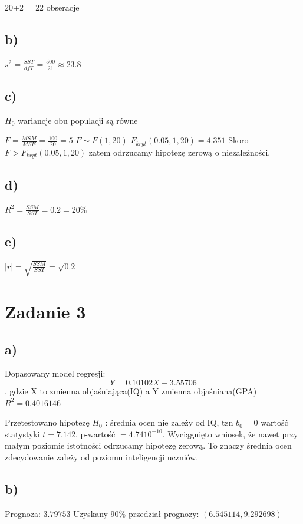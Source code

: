 \documentclass[9pt]{article}  %
\begin{document}
  20+2 = 22 obseracje
  
  \subsection{b)}
  
  $s^2 = \frac{SST}{dfT} = \frac{500}{21} \approx 23.8$
  
  \subsection{c)}
  
  $H_0$ wariancje obu populacji są równe
  
  $F = \frac{MSM}{MSE} = \frac{100}{20} = 5$
  $F \sim F(1, 20)$
  $F_{kryt}(0.05,1,20) = 4.351$
  Skoro $F > F_{kryt}(0.05,1,20)$ zatem odrzucamy hipotezę zerową o niezależności.
  \subsection{d)}
  
  $R^2 = \frac{SSM}{SST} = 0.2 = 20\%$
  
  \subsection{e)}
  $|r| = \sqrt{\frac{SSM}{SST}} = \sqrt{0.2}$

\section{Zadanie 3}

  \subsection{a)}
    Dopasowany model regresji: $$Y = 0.10102 X - 3.55706 $$ , gdzie X to zmienna objaśniająca(IQ) a Y zmienna objaśniana(GPA) \newline
    $R^2 = 0.4016146$ 
    
    Przetestowano hipotezę $H_0$ : średnia ocen nie zależy od IQ, tzn $b_0 = 0$ \newline
    wartość statystyki $t = 7.142$, p-wartość $= 4.74 10^{-10}$. Wyciągnięto wniosek, że nawet przy małym poziomie istotności odrzucamy hipotezę zerową. To znaczy średnia ocen zdecydowanie zależy od poziomu inteligencji uczniów.
  


  \subsection{b)}
    Prognoza: $3.79753$ \newline
    Uzyskany 90\% przedział prognozy: $\left( 6.545114, 9.292698 \right)$
\end{document}
